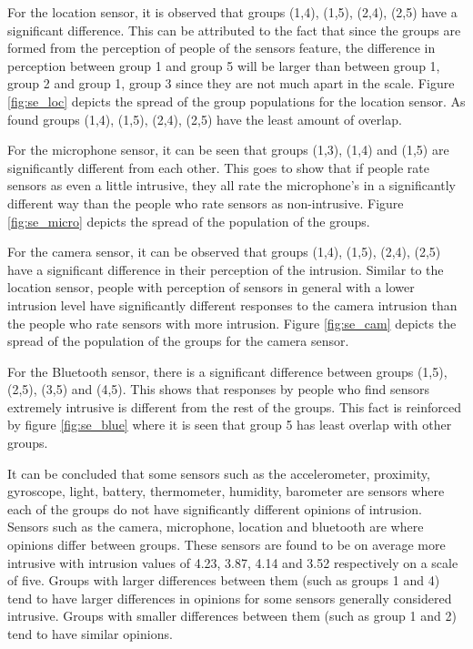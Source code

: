 For the location sensor, it is observed that groups (1,4), (1,5), (2,4), (2,5) have a significant difference. This can be attributed to the fact that since the groups are formed from the perception of people of the sensors feature, the difference in perception between group 1 and group 5 will be larger than between group 1, group 2 and group 1, group 3 since they are not much apart in the scale. Figure \ref{fig:se_loc} depicts the spread of the group populations for the location sensor. As found groups (1,4), (1,5), (2,4), (2,5) have the least amount of overlap.

For the microphone sensor, it can be seen that groups (1,3), (1,4) and (1,5) are significantly different from each other. This goes to show that
if people rate sensors as even a little intrusive, they all rate the microphone's in a significantly different way than the people who rate sensors as non-intrusive. Figure \ref{fig:se_micro} depicts the spread of the population of the groups.

For the camera sensor, it can be observed that groups (1,4), (1,5), (2,4), (2,5) have a significant difference in their perception of the intrusion. Similar to the location sensor, people with perception of sensors in general with a lower intrusion level have significantly different responses to the camera intrusion than the people who rate sensors with more intrusion. Figure \ref{fig:se_cam} depicts the spread of the population of the groups for the camera sensor.

For the Bluetooth sensor, there is a significant difference between groups (1,5), (2,5), (3,5) and (4,5). This shows that responses by people who find sensors extremely intrusive is different from the rest of the groups. This fact is reinforced by figure \ref{fig:se_blue} where it is seen that group 5 has least overlap with other groups.

It can be concluded that some sensors such as the accelerometer, proximity, gyroscope, light, battery, thermometer, humidity, barometer are sensors where each of the groups do not have significantly different opinions of intrusion. Sensors such as the camera, microphone, location and bluetooth
are where opinions differ between groups. These sensors are found to be on average more intrusive with intrusion values of 4.23, 3.87, 4.14 and 3.52 respectively on a scale of five. Groups with larger differences between them (such as groups 1 and 4) tend to have larger differences in opinions for some sensors generally considered intrusive. Groups with smaller differences between them (such as group 1 and 2) tend to have similar opinions.

